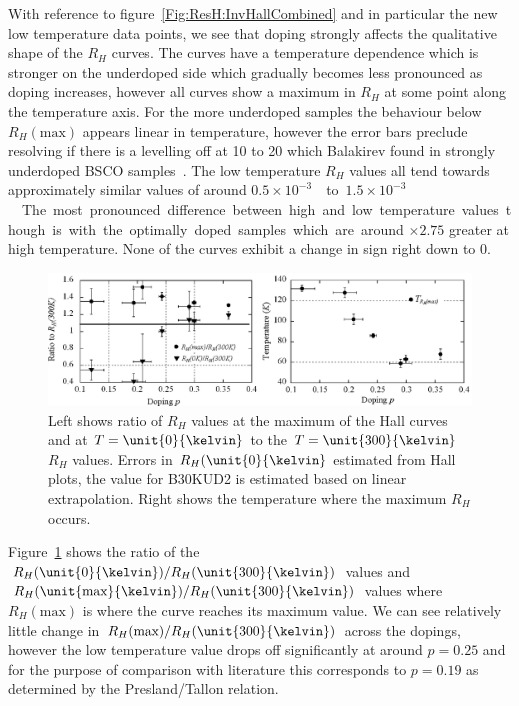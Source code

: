 With reference to figure~\ref{Fig:ResH:InvHallCombined} and in particular the new low temperature data points, we see that doping strongly affects the qualitative shape of the $R_H$ curves. The curves have a temperature dependence which is stronger on the underdoped side which gradually becomes less pronounced as doping increases, however all curves show a maximum in $R_H$ at some point along the temperature axis. For the more underdoped samples the behaviour below $R_H(\textrm{max})$ appears linear in temperature, however the error bars preclude resolving if there is a levelling off at \unit{10}{\kelvin} to \unit{20}{\kelvin} which Balakirev \etal found in strongly underdoped \ac{BSCO} samples~\cite{Balakirev2003}. The low temperature $R_H$ values all tend towards approximately similar values of around \unit{$0.5\times 10^{-3}$}{\centi\metre\cubed\per\coulomb} to \unit{$1.5\times 10^{-3}$}{\centi\metre\cubed\per\coulomb}. The most pronounced difference between high and low temperature values though is with the optimally doped samples which are around $\times 2.75$ greater at high temperature. None of the curves exhibit a change in sign right down to \unit{0}{\kelvin}. 


\begin{figure}[htbp]
    \begin{center}
        \includegraphics[scale=0.8]{Chapter-HallBSCO/Figures/RhRatios/RhRatios}
        \caption{Left shows ratio of $R_H$ values at the maximum of the Hall curves and at $T=\unit{0}{\kelvin}$ to the $T=\unit{300}{\kelvin}$ $R_H$ values. Errors in $R_H(\unit{0}{\kelvin}$ estimated from Hall plots, the value for B30KUD2 is estimated based on linear extrapolation. Right shows the temperature where the maximum $R_H$ occurs.}
        \label{Fig:ResH:RhRatios}
    \end{center}
\end{figure}

Figure~\ref{Fig:ResH:RhRatios} shows the ratio of the $R_H(\unit{0}{\kelvin})/R_H(\unit{300}{\kelvin})$ values and $R_H(\unit{\textrm{max}}{\kelvin})/R_H(\unit{300}{\kelvin})$ values where $R_H(\textrm{max})$ is where the curve reaches its maximum value. We can see relatively little change in $R_H(\textrm{max})/R_H(\unit{300}{\kelvin})$ across the dopings, however the low temperature value drops off significantly at around $p= 0.25$ and for the purpose of comparison with literature this corresponds to $p=0.19$ as determined by the Presland/Tallon relation.

